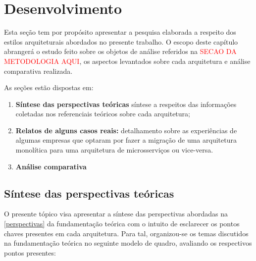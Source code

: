\chapter{Desenvolvimento}

Esta seção tem por propósito apresentar a pesquisa elaborada a respeito dos estilos arquiteturais
abordados no presente trabalho. O escopo deste capítulo abrangerá o estudo feito sobre os objetos de
análise referidos na \textcolor{red}{SECAO DA METODOLOGIA AQUI}, os aspectos levantados sobre cada
arquitetura e análise comparativa realizada.

As seções estão dispostas em:

  \begin{enumerate}
    \item \textbf{Síntese das perspectivas teóricas} síntese a respeitos das informações
        coletadas nos referenciais teóricos sobre cada arquitetura;
    \item \textbf{Relatos de alguns casos reais:} detalhamento sobre as experiências de algumas empresas
    que optaram por fazer a migração de uma arquitetura monolítica para uma arquitetura de
    microsserviços ou vice-versa.
    \item \textbf{Análise comparativa}
  \end{enumerate}

\section{Síntese das perspectivas teóricas}

O presente tópico visa apresentar a síntese das perspectivas abordadas na \autoref{perspectivas} da
fundamentação teórica com o intuito de esclarecer os pontos chaves presentes em cada arquitetura.
Para tal, organizou-se os temas discutidos na fundamentação teórica no seguinte modelo de quadro,
avaliando os respectivos pontos presentes:


